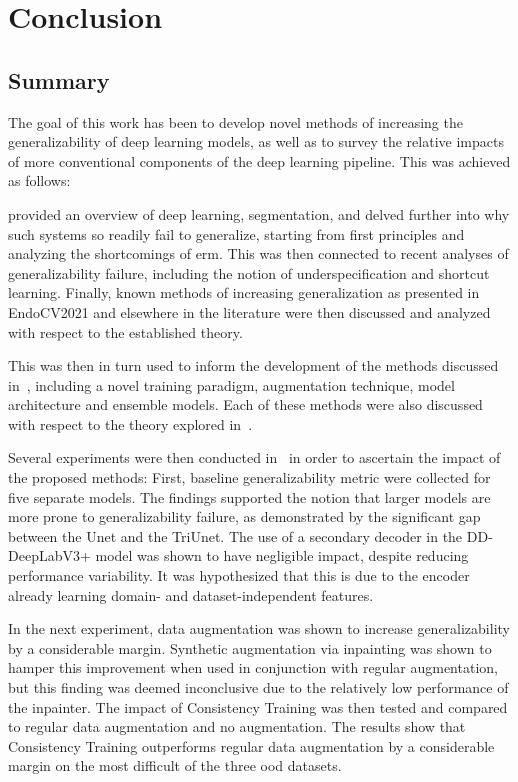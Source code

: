 \chapter{Conclusion}\label{conclusion}
 
\section{Summary}
The goal of this work has been to develop novel methods of increasing the generalizability of deep learning models, as well as to survey the relative impacts of more conventional components of the deep learning pipeline. This was achieved as follows:

 provided an overview of deep learning, segmentation, and delved further into why such systems so readily fail to generalize, starting from first principles and analyzing the shortcomings of \gls{erm}. This was then connected to recent analyses of generalizability failure, including the notion of underspecification and shortcut learning. Finally, known methods of increasing generalization as presented in EndoCV2021 and elsewhere in the literature were then discussed and analyzed with respect to the established theory. 

This was then in turn used to inform the development of the methods discussed in~, including a novel training paradigm, augmentation technique, model architecture and ensemble models. Each of these methods were also discussed with respect to the theory explored in~.

Several experiments were then conducted in~ in order to ascertain the impact of the proposed methods:
First, baseline generalizability metric were collected for five separate models. The findings supported the notion that larger models are more prone to generalizability failure, as demonstrated by the significant gap between the Unet and the TriUnet. The use of a secondary decoder in the DD-DeepLabV3+ model was shown to have negligible impact, despite reducing performance variability. It was hypothesized that this is due to the encoder already learning domain- and dataset-independent features. 

In the next experiment, data augmentation was shown to increase generalizability by a considerable margin. Synthetic augmentation via inpainting was shown to hamper this improvement when used in conjunction with regular augmentation, but this finding was deemed inconclusive due to the relatively low performance of the inpainter. 
The impact of Consistency Training was then tested and compared to regular data augmentation and no augmentation. The results show that Consistency Training outperforms regular data augmentation by a considerable margin on the most difficult of the three \gls{ood} datasets. 

